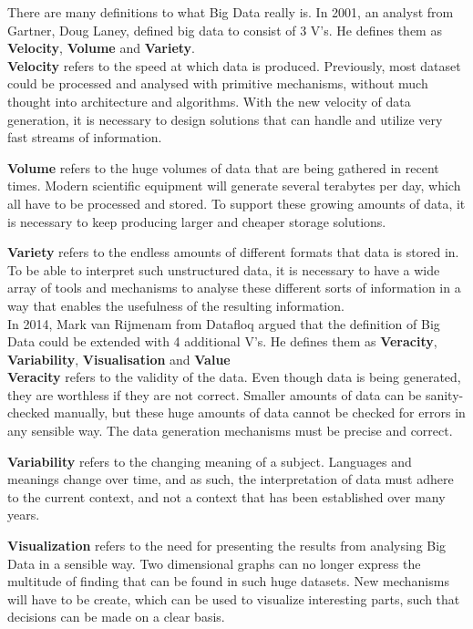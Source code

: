 \documentclass[a4paper]{article}
\begin{document}
There are many definitions to what Big Data really is. In 2001, an analyst from Gartner, Doug Laney, defined big data to consist of 3 V's. He defines them as \textbf{Velocity}, \textbf{Volume} and \textbf{Variety}.\\

\textbf{Velocity} refers to the speed at which data is produced. Previously, most dataset could be processed and analysed with primitive mechanisms, without much thought into architecture and algorithms. With the new velocity of data generation, it is necessary to design solutions that can handle and utilize very fast streams of information.

\textbf{Volume} refers to the huge volumes of data that are being gathered in recent times. Modern scientific equipment will generate several terabytes per day, which all have to be processed and stored. To support these growing amounts of data, it is necessary to keep producing larger and cheaper storage solutions.

\textbf{Variety} refers to the endless amounts of different formats that data is stored in. To be able to interpret such unstructured data, it is necessary to have a wide array of tools and mechanisms to analyse these different sorts of information in a way that enables the usefulness of the resulting information.\\

In 2014, Mark van Rijmenam from Datafloq argued that the definition of Big Data could be extended with 4 additional V's. He defines them as \textbf{Veracity}, \textbf{Variability}, \textbf{Visualisation} and \textbf{Value}\\

\textbf{Veracity} refers to the validity of the data. Even though data is being generated, they are worthless if they are not correct. Smaller amounts of data can be sanity-checked manually, but these huge amounts of data cannot be checked for errors in any sensible way. The data generation mechanisms must be precise and correct.

\textbf{Variability} refers to the changing meaning of a subject. Languages and meanings change over time, and as such, the interpretation of data must adhere to the current context, and not a context that has been established over many years.

\textbf{Visualization} refers to the need for presenting the results from analysing Big Data in a sensible way. Two dimensional graphs can no longer express the multitude of finding that can be found in such huge datasets. New mechanisms will have to be create, which can be used to visualize interesting parts, such that decisions can be made on a clear basis.
\end{document}
